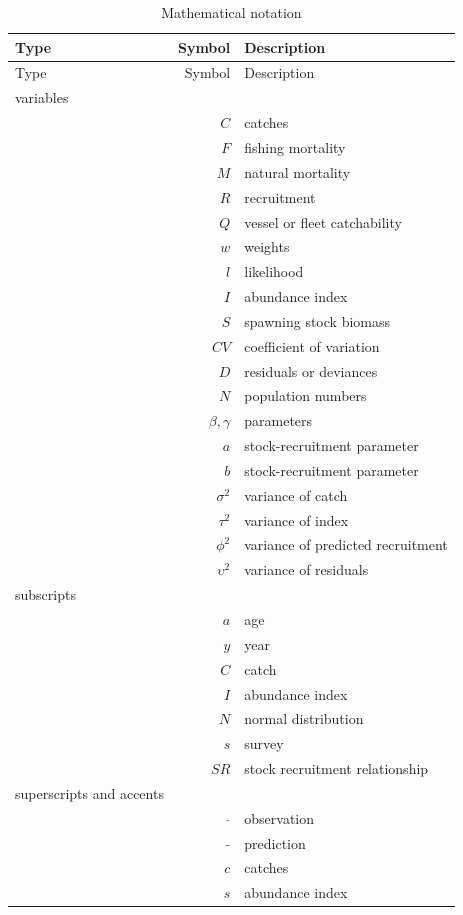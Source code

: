 \documentclass[
]{book}
\begin{document}
\begin{longtable}[]{@{}lrl@{}}
\caption{\label{tab:mathsnotation} Mathematical notation}\tabularnewline
\toprule\noalign{}
Type & Symbol & Description \\
\midrule\noalign{}
\endfirsthead
\toprule\noalign{}
Type & Symbol & Description \\
\midrule\noalign{}
\endhead
\bottomrule\noalign{}
\endlastfoot
variables & & \\
& \(C\) & catches \\
& \(F\) & fishing mortality \\
& \(M\) & natural mortality \\
& \(R\) & recruitment \\
& \(Q\) & vessel or fleet catchability \\
& \(w\) & weights \\
& \(l\) & likelihood \\
& \(I\) & abundance index \\
& \(S\) & spawning stock biomass \\
& \(CV\) & coefficient of variation \\
& \(D\) & residuals or deviances \\
& \(N\) & population numbers \\
& \(\beta, \gamma\) & parameters \\
& \(a\) & stock-recruitment parameter \\
& \(b\) & stock-recruitment parameter \\
& \(\sigma^2\) & variance of catch \\
& \(\tau^2\) & variance of index \\
& \(\phi^2\) & variance of predicted recruitment \\
& \(\upsilon^2\) & variance of residuals \\
subscripts & & \\
& \(a\) & age \\
& \(y\) & year \\
& \(C\) & catch \\
& \(I\) & abundance index \\
& \(N\) & normal distribution \\
& \(s\) & survey \\
& \(SR\) & stock recruitment relationship \\
superscripts and accents & & \\
& \(\hat{}\) & observation \\
& \(\tilde{}\) & prediction \\
& \(c\) & catches \\
& \(s\) & abundance index \\
\end{longtable}
\end{document}
